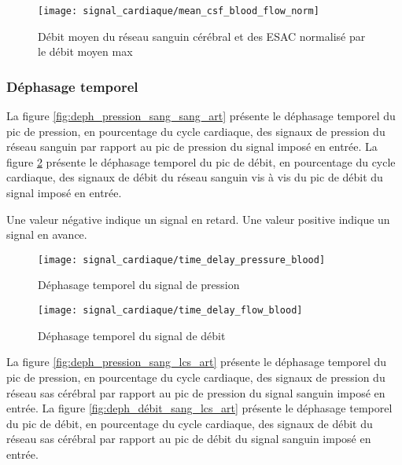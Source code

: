\documentclass[french]{report}
\begin{document}
\begin{figure}
\centering
\texttt{[image: signal\_cardiaque/mean\_csf\_blood\_flow\_norm]}
\caption{Débit moyen du réseau sanguin cérébral et des ESAC normalisé par le débit moyen max}
    \label{fig:débit_moyen_sang_sas_art}
\end{figure}

\subsubsection{Déphasage temporel}

La figure \ref{fig:deph_pression_sang_sang_art} présente le déphasage temporel du pic de pression, en pourcentage du cycle cardiaque, des signaux de pression du réseau sanguin par rapport au pic de pression du signal imposé en entrée.
La figure \ref{fig:deph_débit_sang_sang_art} présente le déphasage temporel du pic de débit, en pourcentage du cycle cardiaque, des signaux de débit du réseau sanguin vis à vis du pic de débit du signal imposé en entrée.

Une valeur négative indique un signal en retard. Une valeur positive indique un signal en avance.


\begin{figure}
  \begin{minipage}{0.5\linewidth}
    \centering
    \texttt{[image: signal\_cardiaque/time\_delay\_pressure\_blood]}
    \caption{Déphasage temporel du signal de pression}
    \label{fig:deph_pression_sang_sang_art}
  \end{minipage}
  \hspace{0.5cm}
  \begin{minipage}{0.5\linewidth}
    \centering
    \texttt{[image: signal\_cardiaque/time\_delay\_flow\_blood]}
    \caption{Déphasage temporel du signal de débit}
    \label{fig:deph_débit_sang_sang_art}
  \end{minipage}
  
\end{figure}

La figure \ref{fig:deph_pression_sang_lcs_art} présente le déphasage temporel du pic de pression, en pourcentage du cycle cardiaque, des signaux de pression du réseau sas cérébral par rapport au pic de pression du signal sanguin imposé en entrée.
La figure \ref{fig:deph_débit_sang_lcs_art} présente le déphasage temporel du pic de débit, en pourcentage du cycle cardiaque, des signaux de débit du réseau sas cérébral par rapport au pic de débit du signal sanguin imposé en entrée.
\end{document}
